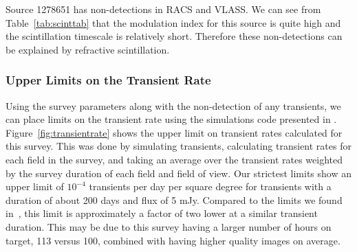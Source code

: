 \documentclass[12pt]{article}
\begin{document}
Source 1278651 has non-detections in RACS and VLASS. We can see from Table~\ref{tab:scinttab} that the modulation index for this source is quite high and the scintillation timescale is relatively short. Therefore these non-detections can be explained by refractive scintillation. 




\subsubsection{Upper Limits on the Transient Rate}
Using the survey parameters along with the non-detection of any transients, we can place limits on the transient rate using the simulations code presented in \citet{2022ascl.soft04007C}. Figure~\ref{fig:transientrate} shows the upper limit on transient rates calculated for this survey. This was done by simulating transients, calculating transient rates for each field in the survey, and taking an average over the transient rates weighted by the survey duration of each field and field of view. Our strictest limits show an upper limit of $10^{-4}$ transients per day per square degree for transients with a duration of about 200 days and flux of 5 mJy. Compared to the limits we found in~\citet{commensal1}, this limit is approximately a factor of two lower at a similar transient duration. This may be due to this survey having a larger number of hours on target, 113 versus 100, combined with having higher quality images on average.
\end{document}
